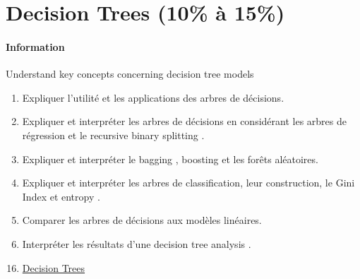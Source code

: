\documentclass[12pt, titlepage, french]{report}
\begin{document}
\newpage
\chapter[Decision Trees]{Decision Trees (10\% à 15\%)}

\subsubsection{Information}

\begin{distributions}[Objective]
Understand key concepts concerning decision tree models
\end{distributions}

\begin{outcomes}
\begin{enumerate}
	\item	Expliquer l'utilité et les applications des arbres de décisions.
	\item	Expliquer et interpréter les arbres de décisions en considérant les arbres de régression et le \og recursive binary splitting \fg{}.
	\item	Expliquer et interpréter le \og bagging \fg{}, \og boosting \fg{} et les forêts aléatoires.
	\item	Expliquer et interpréter les arbres de classification, leur construction, le \og Gini Index \fg{} et \og entropy \fg{}.
	\item	Comparer les arbres de décisions aux modèles linéaires.
	\item	Interpréter les résultats d'une \og decision tree analysis \fg{}.
\end{enumerate}
\end{outcomes}

\begin{ASM_chapter}
\begin{enumerate}
  \setcounter{enumi}{15}
	\item	\hyperref[DECISION-TREES]{Decision Trees}
\end{enumerate}
\end{ASM_chapter}
\end{document}
